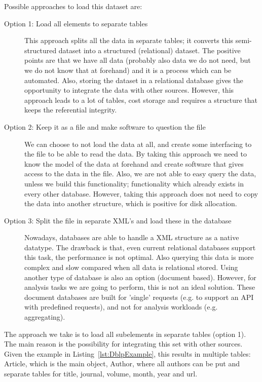 \documentclass{ou-report}
\begin{document}
Possible approaches to load this dataset are:
\begin{description}
\item[Option 1: Load all elements to separate tables] This approach splits all 
the data in separate tables; it converts this semi-structured dataset into a 
structured (relational) dataset. The positive points are that we have all data 
(probably also data we do not need, but we do not know that at forehand) and it 
is a process which can be automated. Also, storing the dataset in a 
relational database gives the opportunity to integrate the data with other 
sources. However, this approach leads to a lot of tables, cost storage and 
requires a structure that keeps the referential integrity.
\item[Option 2: Keep it as a file and make software to question the file] We can 
choose to not load the data at all, and create some interfacing to the file to 
be able to read the data. By taking this approach we need to know the model of 
the data at forehand and create software that gives access to the data in the 
file. Also, we are not able to easy query the data, unless we build this 
functionality; functionality which already exists in \mbox{every} other database. 
However, taking this approach does not need to copy the data into another 
structure, which is positive for disk allocation.
\item[Option 3: Split the file in separate XML's and load these in the database] 
Nowadays, databases are able to handle a XML structure as a native datatype. The 
drawback is that, even current relational databases support this task, the 
performance is not optimal. Also querying this data is more complex and slow 
compared when all data is relational stored. Using another type of database is also 
an option (document based). However, for analysis tasks we are going to perform, 
this is not an ideal solution. These document databases are built for 'single' 
requests (e.g. to support an API with predefined requests), and not for 
analysis workloads (e.g. aggregating).
\end{description}
The approach we take is to load all subelements in separate tables (option 1).
The main reason is the possibility for integrating 
this set with other sources. Given the example in Listing~\ref{lst:DblpExample}, 
this results in multiple tables: Article, which is the main object, Author, 
where all authors can be put and separate tables for title, journal, volume, 
month, year and url.
\end{document}

